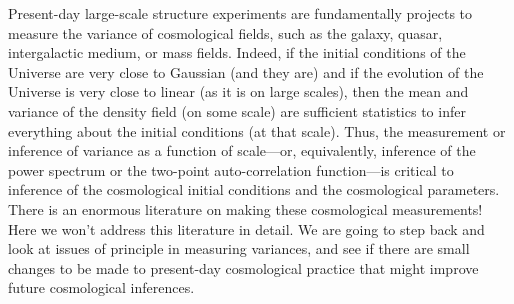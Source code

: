 \documentclass[12pt, letterpaper, preprint]{aastex}
\begin{document}
Present-day large-scale structure experiments are fundamentally
projects to measure the variance of cosmological fields, such as the
galaxy, quasar, intergalactic medium, or mass fields.
Indeed, if the initial conditions of the Universe are very close to
Gaussian (and they are) and if the evolution of the Universe is very
close to linear (as it is on large scales), then the mean and variance
of the density field (on some scale) are sufficient statistics to
infer everything about the initial conditions (at that scale).
Thus, the measurement or inference of variance as a function of
scale---or, equivalently, inference of the power spectrum or the
two-point auto-correlation function---is critical to inference of the
cosmological initial conditions and the cosmological parameters.
There is an enormous literature on making these cosmological
measurements!
Here we won't address this literature in detail.
We are going to step back and look at issues of principle in measuring
variances, and see if there are small changes to be made to
present-day cosmological practice that might improve future cosmological
inferences.
\end{document}
